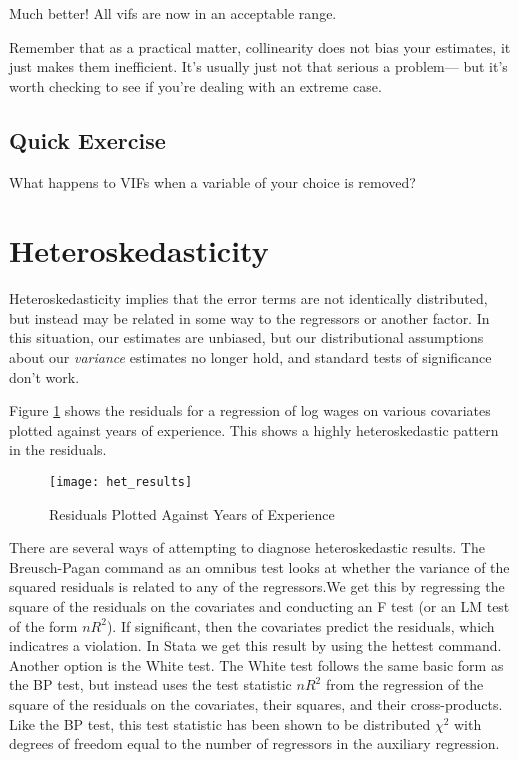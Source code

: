 \documentclass[12pt]{article}
\begin{document}
Much better! All vifs are now in an acceptable range. 

Remember that as a practical matter, collinearity does not bias your
estimates, it just makes them inefficient. It's usually just not that
serious a problem--- but it's worth checking to see if you're dealing
with an extreme case. 

\subsection{Quick Exercise}
\label{sec:quick-exercise}

What happens to VIFs when a variable of your choice is removed? 

\section{Heteroskedasticity}
\label{sec:heteroskedasticity}

Heteroskedasticity implies that the error terms are not identically
distributed, but instead may be related in some way to the regressors
or another factor. In this situation, our estimates are unbiased, but
our distributional assumptions about our \textit{variance} estimates
no longer hold, and standard tests of significance don't work. 

Figure \ref{fig:residplot1} shows the residuals for a regression of
log wages on various covariates plotted against years of
experience. This shows a highly heteroskedastic pattern in the
residuals. 

\begin{figure}[ht!]
  \centering
  \caption{Residuals Plotted Against Years of Experience}
\texttt{[image: het\_results]}
  \label{fig:residplot1}
\end{figure}

There are several ways of attempting to diagnose heteroskedastic
results. The Breusch-Pagan command as an omnibus test looks at whether
the variance of the squared residuals is related to any of the
regressors.We get this by regressing the square of the residuals on
the covariates and conducting an F test (or an LM test of the form
$nR^2$). If significant, then the covariates predict the residuals,
which indicatres a violation.  In Stata we get this result by using
the hettest command. Another option is the White test. The White test
follows the same basic form as the BP test, but instead uses the test
statistic $nR^2$ from the regression of the square of the residuals on
the covariates, their squares, and their cross-products. Like the BP
test, this test statistic has been shown to be distributed $\chi^2$
with degrees of freedom equal to the number of regressors in the
auxiliary regression.
\end{document}
